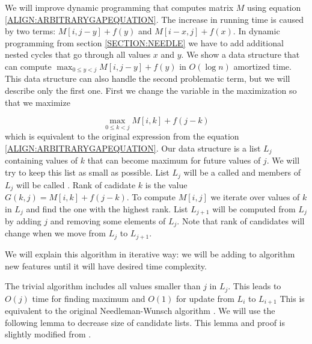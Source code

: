 We will improve dynamic programming that computes matrix $M$ using equation
\ref{ALIGN:ARBITRARYGAPEQUATION}. The increase in running time is caused by two
terms: $M[i,j-y]+f(y)$ and
$M[i-x,j]+f(x)$. In dynamic programming from section \ref{SECTION:NEEDLE} we  have
to add additional nested cycles that go through all values $x$ and $y$. We show
a data
structure that can compute $\max_{0\leq y < j}M[i,j-y]+f(y)$ in $O(\log n)$
amortized time.
This data structure can also handle the second problematic term, but we
will describe only the first one. First we change the variable in the
maximization so that we maximize

\begin{equation}
\max_{0\leq k < j}M[i,k]+f(j-k)\label{CONVEX:MAXFUNCTION}
\end{equation}
which is equivalent to the original expression from the equation
\ref{ALIGN:ARBITRARYGAPEQUATION}.  Our data structure is a list $L_j$ containing
values of 
$k$ that can become maximum for future values of $j$. We will try to keep this list as small as
possible. List $L_j$ will be a called  and members of $L_j$
will be called . Rank of cadidate $k$ is the value
$G(k,j)=M[i,k]+f(j-k)$. To compute $M[i,j]$ we iterate over values of $k$ in
$L_j$ and find the one with the highest rank.
List $L_{j+1}$ will be computed from $L_j$ by adding $j$ and
removing some elements of $L_j$. 
Note that rank of
candidates will change when we move from $L_j$ to $L_{j+1}$.

We will explain this algorithm in iterative way: we will be adding to algorithm
new features until it will have desired time complexity. 

The trivial algorithm includes all values smaller than $j$ in $L_j$.
This leads to $O(j)$ time for finding maximum and $O(1)$ for update
from $L_i$ to $L_{i+1}$
This is equivalent to the original Needleman-Wunsch algorithm
\cite{Needleman1970}. 
We will use the following lemma to
decrease size of candidate lists. This lemma and proof is  slightly modified
from 
\cite{GusfieldBook}.


